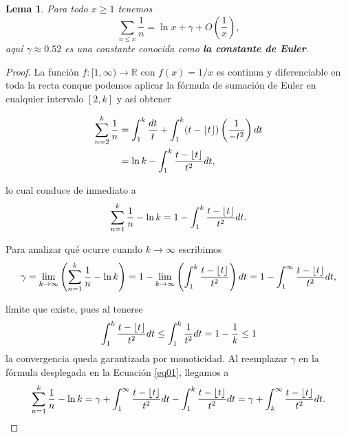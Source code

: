 \documentclass[10pt]{article}
\DeclarePairedDelimiter\floor{\lfloor}{\rfloor}
\newtheorem{lemma}[theorem]{Lema}
\theoremstyle{definition}
\theoremstyle{remark}
\newcommand{\BR}{\mathbb R}
\begin{document}
\begin{lemma}\label{lem08}
Para todo $x \geq 1$ tenemos
\[
\sum_{n \leq x} \frac{1}{n} = \ln x + \gamma + O\left(\frac{1}{x}\right),
\]
aqu\'i $\gamma \approx 0.52$ es una constante conocida como {\bf la constante de Euler}. 
\end{lemma}

\begin{proof}
La funci\'on $f : [1, \infty) \to \BR$ con $f(x)=1/x$ es continua y diferenciable en toda la recta  
conque podemos aplicar la f\'ormula de sumaci\'on de Euler en cualquier intervalo $[2, k]$ 
y as\'i obtener 

\begin{align}
\sum_{n = 2}^k \frac{1}{n} &= \int_1^k \frac{dt}{t} + \int_{1}^k (t - \floor{t})\left(\frac{1}{-t^2}\right) dt \\
&= \ln k - \int_1^k \frac{t - \floor{t}}{t^2} dt,
\end{align} 

lo cual conduce de inmediato a 
\begin{align}
\sum_{n = 1}^k \frac{1}{n} - \ln k = 1 - \int_1^k \frac{t - \floor{t}}{t^2} dt.\label{eq01}
\end{align}

Para analizar qu\'e ocurre cuando $k \to \infty$ escribimos
\begin{align}
\gamma = \lim_{k \to \infty} \left(\sum_{n = 1}^k \frac{1}{n} - \ln k\right) 
= 1- \lim_{k \to \infty}  \left(\int_1^k \frac{t - \floor{t}}{t^2}\right) dt 
=  1- \int_1^\infty \frac{t - \floor{t}}{t^2} dt,
\end{align}

l\'imite que existe, pues al tenerse 
\begin{align}
\int_1^k \frac{t - \floor{t}}{t^2} dt  \le \int_1^k \frac{1}{t^2} dt 
= 1 -\frac{1}{k}   \le 1
\end{align}
la convergencia queda garantizada por monoticidad. 
Al reemplazar $\gamma$ en la f\'ormula desplegada en la Ecuaci\'on \ref{eq01}, llegamos a 
\begin{align}
\sum_{n = 1}^k \frac{1}{n} - \ln k = \gamma + \int_1^\infty \frac{t - \floor{t}}{t^2} dt - \int_1^k \frac{t - \floor{t}}{t^2} dt = 
 \gamma  +  \int_k^\infty \frac{t - \floor{t}}{t^2} dt.
\end{align}


\end{proof}
\end{document}
